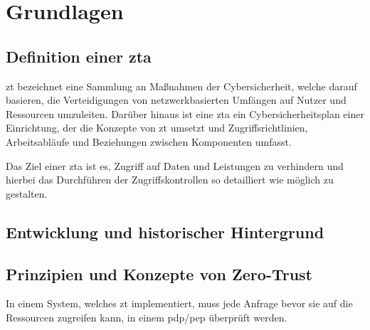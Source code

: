\newpage


\section{Grundlagen}\label{sec:grundlagen}
\subsection[Definition einer Zero-Trust-Architektur]{Definition einer \gls{zta}}\label{subsec:definition-einer-zta}
\gls{zt} bezeichnet eine Sammlung an Maßnahmen der Cybersicherheit, welche darauf basieren, die Verteidigungen von netzwerkbasierten Umfängen auf Nutzer und Ressourcen umzuleiten\autocite[\vglf][]{NIST:800207}.
Darüber hinaus ist eine \gls{zta} ein Cybersicherheitsplan einer Einrichtung, der die Konzepte von \gls{zt} umsetzt und Zugriffsrichtlinien, Arbeitsabläufe und Beziehungen zwischen Komponenten umfasst.\autocite[\vglf][]{NIST:800207}

Das Ziel einer \gls{zta} ist es,  Zugriff auf Daten und Leistungen zu verhindern und hierbei das Durchführen der Zugriffskontrollen so detailliert wie möglich zu gestalten.

\subsection{Entwicklung und historischer Hintergrund}\label{subsec:entwicklung-und-historischer-hintergrund}

\subsection{Prinzipien und Konzepte von Zero-Trust}\label{subsec:prinzipien-und-konzepte-von-zero-trust}

In einem System, welches \gls{zt} implementiert, muss jede Anfrage bevor sie auf die Ressourcen zugreifen kann, in einem \gls{pdp}/\gls{pep} überprüft werden\autocite[\vglf][]{NIST:800207}.

